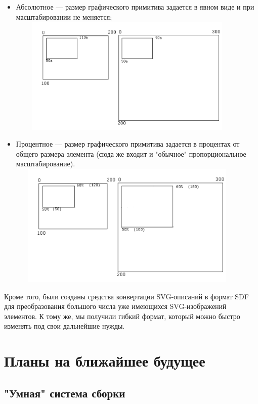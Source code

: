 \documentclass[a5paper]{article}
\begin{document}
\begin{itemize}
  \item Абсолютное --- размер графического примитива задается в явном виде и при
	масштабировании не меняется;\newline
    \includegraphics[width=11.622cm,height=5.646cm]{draft04-img4.jpg}
  \item Процентное --- размер графического примитива задается в процентах от
	общего размера элемента (сюда же входит и "обычное" пропорциональное
	масштабирование).\newline
    \includegraphics[width=11.582cm,height=5.927cm]{draft04-img5.jpg}
\end{itemize}

Кроме того, были созданы средства конвертации SVG-описаний в формат SDF
для преобразования большого числа уже имеющихся SVG-изображений
элементов. К тому же, мы получили гибкий формат, который можно быстро
изменять под свои дальнейшие нужды.

\section{Планы на ближайшее будущее}
\subsection{"Умная" система сборки}
\end{document}
